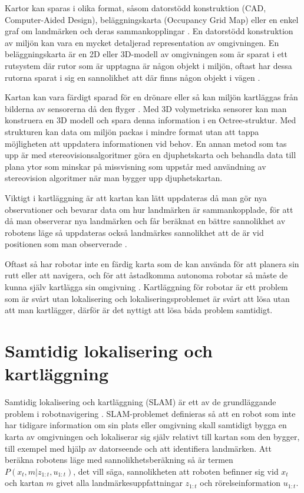 Kartor kan sparas i olika format, såsom datorstödd konstruktion (CAD, Computer-Aided Design), beläggningskarta (Occupancy Grid Map) eller en enkel graf om landmärken och deras sammankopplingar \citep{982903}. En datorstödd konstruktion av miljön kan vara en mycket detaljerad representation av omgivningen. En beläggningskarta är en 2D eller 3D-modell av omgivningen som är sparat i ett rutsystem där rutor som är upptagna är någon objekt i miljön, oftast har dessa rutorna sparat i sig en sannolikhet att där finns någon objekt i vägen \citep{6095058, 982903}. 

Kartan kan vara färdigt sparad för en drönare eller så kan miljön kartläggas från bilderna av sensorerna då den flyger \citep{geospatial}. Med 3D volymetriska sensorer kan man konstruera en 3D modell och spara denna information i en Octree-struktur. Med strukturen kan data om miljön packas i mindre format utan att tappa möjligheten att uppdatera informationen vid behov. En annan metod som tas upp är med stereovisionsalgoritmer göra en djuphetskarta och behandla data till plana ytor som minskar på missvisning som uppstår med användning av stereovision algoritmer när man bygger upp djuphetskartan. 

Viktigt i kartläggning är att kartan kan lätt uppdateras då man gör nya observationer och bevarar data om hur landmärken är sammankopplade, för att då man observerar nya landmärken och får beräknat en bättre sannolikhet av robotens läge så uppdateras också landmärkes sannolikhet att de är vid positionen som man observerade \citep{globalsubmaps}.

Oftast så har robotar inte en färdig karta som de kan använda för att planera sin rutt eller att navigera, och för att åstadkomma autonoma robotar så måste de kunna själv kartlägga sin omgivning \citep{ProbabilisticRobotics}. Kartläggning för robotar är ett problem som är svårt utan lokalisering och lokaliseringsproblemet är svårt att lösa utan att man kartlägger, därför är det nyttigt att lösa båda problem samtidigt. 

\chapter{Samtidig lokalisering och kartläggning}

Samtidig lokalisering och kartläggning (SLAM) är ett av de grundläggande problem i robotnavigering \citep{realslamproblem}. SLAM-problemet definieras så att en robot som inte har tidigare information om sin plats eller omgivning skall samtidigt bygga en karta av omgivningen och lokaliserar sig själv relativt till kartan som den bygger, till exempel med hjälp av datorseende och att identifiera landmärken. Att beräkna robotens läge med sannolikhetsberäkning så är termen $P(x_t, m|z_{1:t}, u_{1:t})$, det vill säga, sannolikheten att roboten befinner sig vid $x_t$ och kartan $m$ givet alla landmärkesuppfattningar $z_{1:t}$ och rörelseinformation $u_{1:t}$. 

